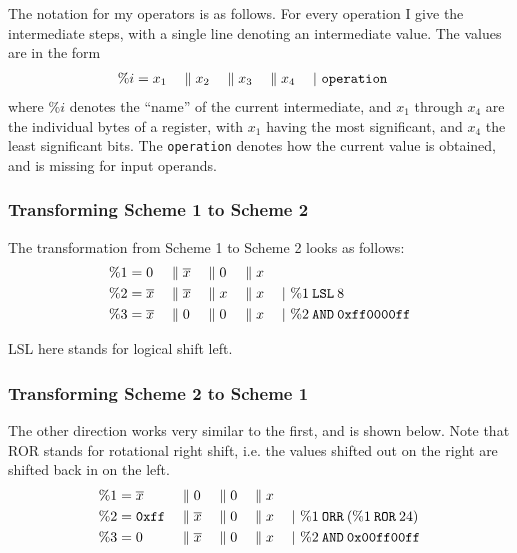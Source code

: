 The notation for my operators is as follows.
For every operation I give the intermediate steps, with a single line denoting an intermediate value.
The values are in the form
\begin{align*}
  \%i &= x_1 &&\; \| \; x_2 &&\; \| \; x_3 &&\; \| \; x_4 && \;|\ \texttt{operation}
\end{align*}
where $\%i$ denotes the ``name'' of the current intermediate, and $x_1$ through $x_4$ are the individual bytes of a register, with $x_1$ having the most significant, and $x_4$ the least significant bits.
The \texttt{operation} denotes how the current value is obtained, and is missing for input operands.


\subsubsection{Transforming Scheme 1 to Scheme 2}
The transformation from Scheme 1 to Scheme 2 looks as follows:
\begin{align*}
  \%1 &= 0 &&\; \| \; \overline{x} &&\; \| \; 0 &&\; \| \; x &&\\
  \%2 &= \overline{x} &&\; \| \; \overline{x} &&\; \| \; x &&\; \| \; x && \;|\ \%1 \mathbin{\texttt{LSL}} 8\\
  \%3 &= \overline{x} &&\; \| \; 0 &&\; \| \; 0 &&\; \| \; x && \;|\ \%2 \mathbin{\texttt{AND}} \texttt{0xff0000ff}
\end{align*}

LSL here stands for logical shift left.

\subsubsection{Transforming Scheme 2 to Scheme 1}
The other direction works very similar to the first, and is shown below.
Note that ROR stands for rotational right shift, i.e. the values shifted out on the right are shifted back in on the left.
\begin{align*}
  \%1 &= \overline{x} &&\; \| \; 0 &&\; \| \; 0 &&\; \| \; x &&\\
  \%2 &= \texttt{0xff} &&\; \| \; \overline{x} &&\; \| \; 0 &&\; \| \; x && \;|\ \%1 \mathbin{\texttt{ORR}} (\%1 \mathbin{\texttt{ROR}} 24)\\
  \%3 &= 0 &&\; \| \; \overline{x} &&\; \| \; 0 &&\; \| \; x && \;|\ \%2 \mathbin{\texttt{AND}} \texttt{0x00ff00ff}
\end{align*}

